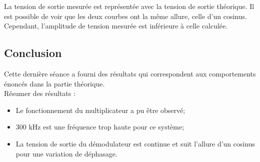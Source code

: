La tension de sortie mesurée est représentée avec la tension de sortie théorique. Il est possible
de voir que les deux courbes ont la même allure, celle d'un cosinus. Cependant, l'amplitude de 
tension mesurée est inférieure à celle calculée.

\subsection{Conclusion}

Cette dernière séance a fourni des résultats qui correspondent aux comportements énoncés dans la 
partie théorique.\\

Résumer des résultats :

\begin{itemize}
    \item Le fonctionnement du multiplicateur a pu être observé;
    \item 300 kHz est une fréquence trop haute pour ce système;
    \item La tension de sortie du démodulateur est continue et suit l'allure d'un cosinus pour une 
    variation de déphasage.
\end{itemize}